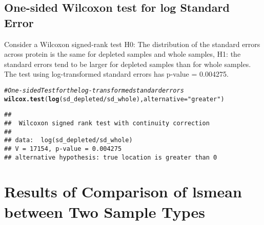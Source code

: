 \documentclass{article}\usepackage[]{graphicx}\usepackage[]{color}
\makeatletter
\newcommand{\hlstr}[1]{\textcolor[rgb]{0.192,0.494,0.8}{#1}}%
\newcommand{\hlcom}[1]{\textcolor[rgb]{0.678,0.584,0.686}{\textit{#1}}}%
\newcommand{\hlopt}[1]{\textcolor[rgb]{0,0,0}{#1}}%
\newcommand{\hlstd}[1]{\textcolor[rgb]{0.345,0.345,0.345}{#1}}%
\newcommand{\hlkwc}[1]{\textcolor[rgb]{0.333,0.667,0.333}{#1}}%
\newcommand{\hlkwd}[1]{\textcolor[rgb]{0.737,0.353,0.396}{\textbf{#1}}}%
\newenvironment{kframe}{%
 \def\at@end@of@kframe{}%
 \ifinner\ifhmode%
  \def\at@end@of@kframe{\end{minipage}}%
  \begin{minipage}{\columnwidth}%
 \fi\fi%
 \def\FrameCommand##1{\hskip\@totalleftmargin \hskip-\fboxsep
 \colorbox{shadecolor}{##1}\hskip-\fboxsep
     \hskip-\linewidth \hskip-\@totalleftmargin \hskip\columnwidth}%
 \MakeFramed {\advance\hsize-\width
   \@totalleftmargin\z@ \linewidth\hsize
   \@setminipage}}%
 {\par\unskip\endMakeFramed%
 \at@end@of@kframe}
\newenvironment{knitrout}{}{} %
\makeatother
\begin{document}
\subsection{One-sided Wilcoxon test for log Standard Error}
Consider a Wilcoxon signed-rank test H0: The distribution of the  standard errors across protein   is the same for  depleted samples and whole samples, H1: the standard errors tend to be larger for depleted samples than for whole samples.  The test using log-transformed standard errors has p-value = 0.004275. 

\begin{knitrout}
\color{fgcolor}\begin{kframe}
\begin{alltt}
\hlcom{# One-sided Test for the log-transformed standard errors}
\hlkwd{wilcox.test}\hlstd{(}\hlkwd{log}\hlstd{(sd_depleted}\hlopt{/}\hlstd{sd_whole),} \hlkwc{alternative} \hlstd{=} \hlstr{"greater"}\hlstd{)}
\end{alltt}
\begin{verbatim}
## 
## 	Wilcoxon signed rank test with continuity correction
## 
## data:  log(sd_depleted/sd_whole)
## V = 17154, p-value = 0.004275
## alternative hypothesis: true location is greater than 0
\end{verbatim}
\end{kframe}
\end{knitrout}


% 
% 
% 



\section{Results of Comparison of lsmean between Two Sample Types}
\end{document}
